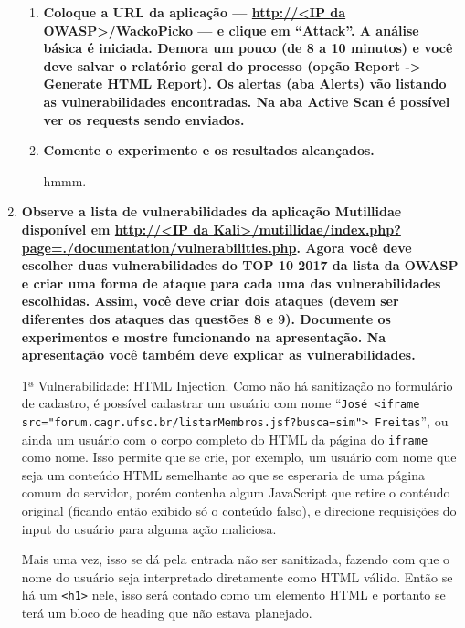 \documentclass{article}
\newcommand{\code}[1]{\texttt{#1}}
\begin{document}
\begin{enumerate}
            \begin{enumerate}
                \item \textbf{Coloque a URL da aplicação --- \url{http://<IP da
                        OWASP>/WackoPicko} --- e clique em ``Attack''. A
                        análise básica é iniciada. Demora um pouco (de 8 a 10
                        minutos) e você deve salvar o relatório geral do
                        processo (opção Report -> Generate HTML Report). Os
                        alertas (aba Alerts) vão listando as vulnerabilidades
                        encontradas. Na aba Active Scan é possível ver os
                    requests sendo enviados.}

                \item \textbf{Comente o experimento e os resultados
                    alcançados.}

                    hmmm.
            \end{enumerate}
    \item \textbf{Observe a lista de vulnerabilidades da aplicação
        Mutillidae disponível em \url{http://<IP da
        Kali>/mutillidae/index.php?page=./documentation/vulnerabilities.php}.
        Agora você deve escolher duas vulnerabilidades do TOP 10 2017
        da lista da OWASP e criar uma forma de ataque para cada uma das
        vulnerabilidades escolhidas. Assim, você deve criar dois
        ataques (devem ser diferentes dos ataques das questões 8 e 9).
        Documente os experimentos e mostre funcionando na apresentação.
        Na apresentação você também deve explicar as vulnerabilidades.}

        1ª Vulnerabilidade: HTML Injection. Como não há sanitização no
        formulário de cadastro, é possível cadastrar um usuário com nome
        ``\texttt{José <iframe
        src="forum.cagr.ufsc.br/listarMembros.jsf?busca=sim"> Freitas}'',
        ou ainda um usuário com o corpo completo do HTML da página do
        \code{iframe} como nome.
        Isso permite que se crie, por exemplo, um usuário com nome que seja
        um conteúdo HTML semelhante ao que se esperaria de uma página comum
        do servidor, porém contenha algum JavaScript que retire o contéudo
        original (ficando então exibido só o conteúdo falso), e direcione
        requisições do input do usuário para alguma ação maliciosa.

        Mais uma vez, isso se dá pela entrada não ser sanitizada, fazendo
        com que o nome do usuário seja interpretado diretamente como HTML
        válido. Então se há um \code{<h1>} nele, isso será contado como um
        elemento HTML e portanto se terá um bloco de heading que não estava
        planejado.
    \end{enumerate}
\end{document}
